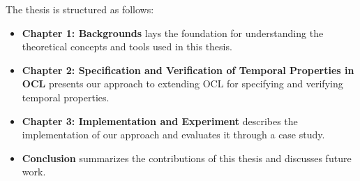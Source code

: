The thesis is structured as follows:
\begin{itemize}
  \item \textbf{Chapter 1: Backgrounds} lays the foundation for understanding the theoretical concepts and tools used in this thesis.
  
  \item \textbf{Chapter 2: Specification and Verification of Temporal Properties in OCL} presents our approach to extending OCL for specifying and verifying temporal properties.

  \item \textbf{Chapter 3: Implementation and Experiment} describes the implementation of our approach and evaluates it through a case study.

  \item \textbf{Conclusion} summarizes the contributions of this thesis and discusses future work.
\end{itemize}
  




